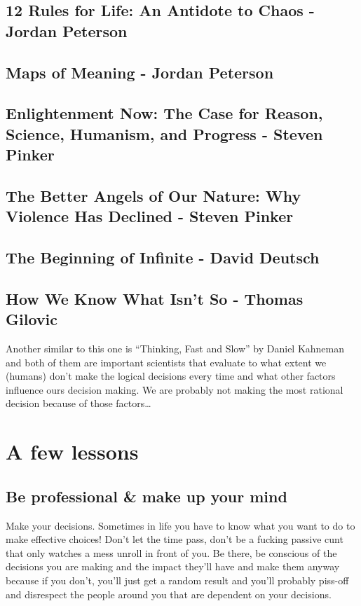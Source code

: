 \subsection{12 Rules for Life: An Antidote to Chaos - Jordan Peterson}

\subsection{Maps of Meaning - Jordan Peterson}

\subsection{Enlightenment Now: The Case for Reason, Science, Humanism, and Progress - Steven Pinker}

\subsection{The Better Angels of Our Nature: Why Violence Has Declined - Steven Pinker}

\subsection{The Beginning of Infinite - David Deutsch}

\subsection{How We Know What Isn't So - Thomas Gilovic}

Another similar to this one is ``Thinking, Fast and Slow'' by Daniel Kahneman and both of them are important scientists that evaluate to what extent we (humans) don't make the logical decisions every time and what other factors influence ours decision making. We are probably not making the most rational decision because of those factors\dots






\section{A few lessons}

\subsection{Be professional \& make up your mind}
Make your decisions. Sometimes in life you have to know what you want to do to make effective choices! Don't let the time pass, don't be a fucking passive cunt that only watches a mess unroll in front of you. Be there, be conscious of the decisions you are making and the impact they'll have and make them anyway because if you don't, you'll just get a random result and you'll probably piss-off and disrespect the people around you that are dependent on your decisions.


